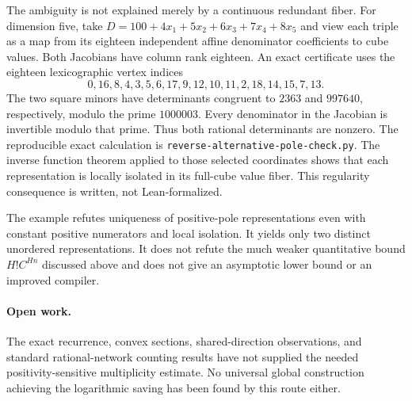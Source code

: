 \documentclass[11pt]{article}
\begin{document}
The ambiguity is not explained merely by a continuous redundant fiber.
For dimension five, take
$D=100+4x_1+5x_2+6x_3+7x_4+8x_5$ and view each triple as a map from
its eighteen independent affine denominator coefficients to cube values.
Both Jacobians have column rank eighteen. An exact certificate uses
the eighteen lexicographic vertex indices
\[
 0,16,8,4,3,5,6,17,9,12,10,11,2,18,14,15,7,13.
\]
The two square minors have determinants congruent to $2363$ and
$997640$, respectively, modulo the prime $1000003$. Every denominator
in the Jacobian is invertible modulo that prime. Thus both rational
determinants are nonzero. The reproducible exact calculation is
\texttt{reverse-alternative-pole-check.py}. The inverse function theorem
applied to those selected coordinates shows that each representation is
locally isolated in its full-cube value fiber. This regularity consequence
is written, not Lean-formalized.

The example refutes uniqueness of positive-pole representations even
with constant positive numerators and local isolation. It yields only
two distinct unordered representations. It does not refute the much
weaker quantitative bound $H!C^{Hn}$ discussed above and does not give
an asymptotic lower bound or an improved compiler.

\paragraph{Open work.}
The exact recurrence, convex sections, shared-direction observations,
and standard rational-network counting results have not supplied the
needed positivity-sensitive multiplicity estimate. No universal
global construction achieving the logarithmic saving has been found
by this route either.
\end{document}
